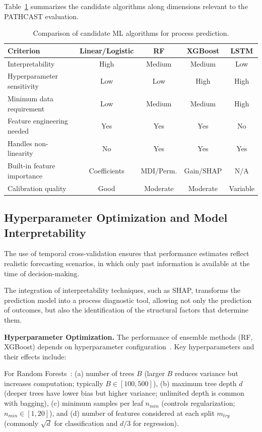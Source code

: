 Table~\ref{tab:ml-algorithms} summarizes the candidate algorithms along
dimensions relevant to the PATHCAST evaluation.

\begin{table}[htb]
\centering
\caption{Comparison of candidate ML algorithms for process prediction.}
\label{tab:ml-algorithms}
\begin{tabular}{lcccc}
\toprule
\textbf{Criterion} & \textbf{Linear/Logistic} & \textbf{RF} &
\textbf{XGBoost} & \textbf{LSTM} \\
\midrule
Interpretability & High & Medium & Medium & Low \\
Hyperparameter sensitivity & Low & Low & High & High \\
Minimum data requirement & Low & Medium & Medium & High \\
Feature engineering needed & Yes & Yes & Yes & No \\
Handles non-linearity & No & Yes & Yes & Yes \\
Built-in feature importance & Coefficients & MDI/Perm. & Gain/SHAP & N/A \\
Calibration quality & Good & Moderate & Moderate & Variable \\
\bottomrule
\end{tabular}
\end{table}


\subsection{Hyperparameter Optimization and Model Interpretability}
\label{sec:ml-hyperparams}
The use of temporal cross-validation ensures that performance estimates reflect realistic forecasting scenarios, in which only past information is available at the time of decision-making.

The integration of interpretability techniques, such as SHAP, transforms the prediction model into a process diagnostic tool, allowing not only the prediction of outcomes, but also the identification of the structural factors that determine them.


\textbf{Hyperparameter Optimization.} The performance of ensemble methods (RF,
XGBoost) depends on hyperparameter configuration~\cite{bergstra2012random}.
Key hyperparameters and their effects include:

For Random Forests~\cite{bergstra2012random}: (a) number of trees $B$ (larger
$B$ reduces variance but increases computation; typically $B \in [100, 500]$),
(b) maximum tree depth $d$ (deeper trees have lower bias but higher variance;
unlimited depth is common with bagging), (c) minimum samples per leaf $n_{min}$
(controls regularization; $n_{min} \in [1, 20]$), and (d) number of features
considered at each split $m_{try}$ (commonly $\sqrt{d}$ for classification and
$d/3$ for regression).

